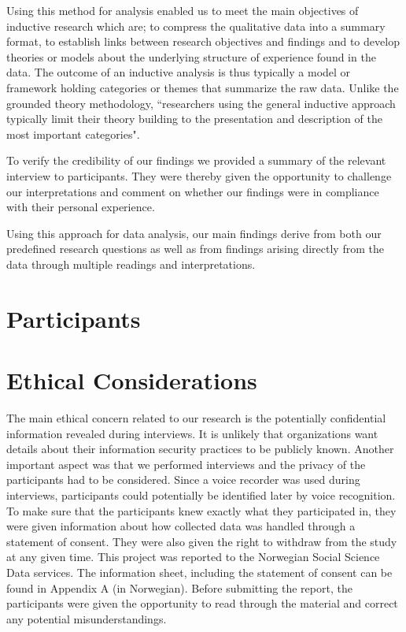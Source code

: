 Using this method for analysis enabled us to meet the main objectives of inductive research which are; to compress the qualitative data into a summary format, to establish links between research objectives and findings and to develop theories or models about the underlying structure of experience found in the data\cite{thomas2006general}. The outcome of an inductive analysis is thus typically a model or framework holding categories or themes that summarize the raw data. Unlike the grounded theory methodology, ``researchers using the general inductive approach typically limit their theory building to the presentation and description of the most important categories"\cite{thomas2006general}.

To verify the credibility of our findings we provided a summary of the relevant interview to participants. They were thereby given the opportunity to challenge our interpretations and comment on whether our findings were in compliance with their personal experience.

Using this approach for data analysis, our main findings derive from both our predefined research questions as well as from findings arising directly from the data through multiple readings and interpretations. 

\section{Participants}

\section{Ethical Considerations}
\label{sec:ethical}
The main ethical concern related to our research is the potentially confidential information revealed during interviews. It is unlikely that organizations want details about their information security practices to be publicly known. Another important aspect was that we performed interviews and the privacy of the participants had to be considered. Since a voice recorder was used during interviews, participants could potentially be identified later by voice recognition. To make sure that the participants knew exactly what they participated in, they were given information about how collected data was handled through a statement of consent. They were also given the right to withdraw from the study at any given time. This project was reported to the Norwegian Social Science Data services. The information sheet, including the statement of consent can be found in Appendix A (in Norwegian). Before submitting the report, the participants were given the opportunity to read through the material and correct any potential misunderstandings.   

